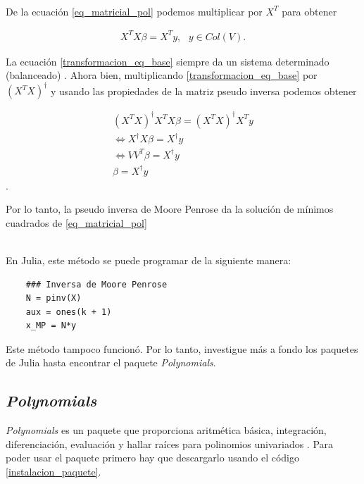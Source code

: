 \\

De la ecuación \ref{eq_matricial_pol} podemos multiplicar por $X^{T}$ para obtener

\begin{equation}
\label{transformacion_eq_base}
    \begin{aligned}
    X^{T}X \beta = X^{T} y, \text{ } y \in Col(V).
    \end{aligned}
\end{equation}

La ecuación \ref{transformacion_eq_base} siempre da un sistema determinado (balanceado) \cite{worldScientificNews}. Ahora bien, multiplicando \ref{transformacion_eq_base} por $(X^{T}X)^{\dagger}$ y usando las propiedades de la matriz pseudo inversa podemos obtener 


\begin{equation*}
    \begin{aligned}
    (X^{T}X)^{\dagger} X^{T}X \beta = (X^{T}X)^{\dagger} X^{T} y \\
    \iff X^{\dagger} X \beta = X^{\dagger} y \\
    \iff V V^{T} \beta = X^{\dagger} y \\
    \beta = X^{\dagger} y 
    \end{aligned}
\end{equation*}. 

Por lo tanto, la pseudo inversa de Moore Penrose da la solución de mínimos cuadrados de \ref{eq_matricial_pol} \cite{worldScientificNews}

\\

En Julia, este método se puede programar de la siguiente manera:

\begin{verbatim}
    ### Inversa de Moore Penrose
    N = pinv(X)
    aux = ones(k + 1)
    x_MP = N*y 
\end{verbatim}

Este método tampoco funcionó. Por lo tanto, investigue más a fondo los paquetes de Julia hasta encontrar el paquete \textit{Polynomials}. 

\subsection{\textit{Polynomials}}
\textit{Polynomials} es un paquete que proporciona aritmética básica, integración, diferenciación, evaluación y hallar raíces para polinomios univariados \cite{poly_manual}. Para poder usar el paquete primero hay que descargarlo usando el código \ref{instalacion_paquete}. 

